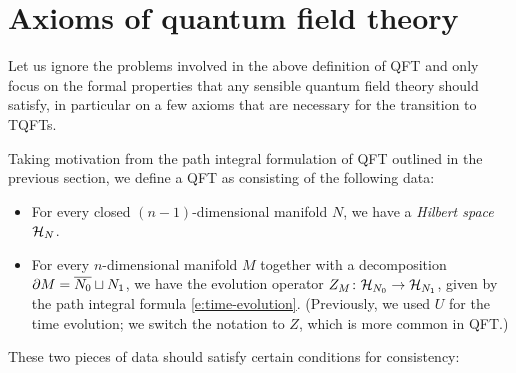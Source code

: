 \section{Axioms of quantum field theory}\label{s:axioms-field-theory}

Let us ignore the problems involved in the above definition of QFT and
only focus on the formal properties that any sensible quantum field theory
should satisfy, in particular on a few
axioms that are necessary for the transition to TQFTs.

Taking motivation from the path integral formulation of QFT outlined in the
previous section, we define a QFT as consisting of the following data:
\begin{itemize}
  \item For every closed $(n-1)$-dimensional manifold $N$, we have a
    \emph{Hilbert space} $\mathcal{H}_N$.
  \item For every $n$-dimensional manifold $M$ together with a decomposition
    $\partial M=\overline{N_0}\sqcup N_1$, we have the evolution operator $Z_M\colon
   \mathcal{H}_{N_0}\to \mathcal{H}_{N_1}$, given by the path integral formula
   \eqref{e:time-evolution}. (Previously, we used $U$ for the time
  evolution; we switch the notation to $Z$, which is more common in QFT.)
\end{itemize}

These two pieces of data should satisfy certain conditions for consistency:


